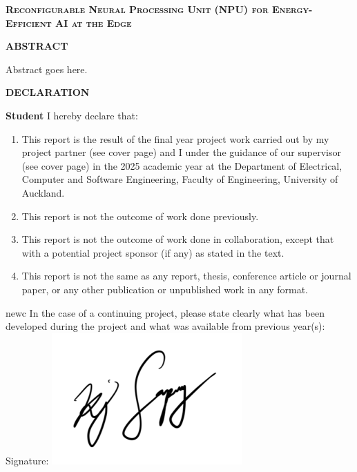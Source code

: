 \documentclass[12pt, a4paper, ukenglish]{article}
\begin{document}
\clearpage

\noindent \reportNumber

\vspace{1em}
\begin{center}
    {\large \textbf{\scshape Reconfigurable Neural Processing Unit (NPU) for Energy-Efficient AI at the Edge}}
\end{center}

\vspace{2em}
\begin{center}
    {\large \textbf{\name}}
\end{center}

\vspace{2em}
\begin{center}
    {\large \textbf{\scshape ABSTRACT}}
\end{center}

Abstract goes here.

% 
\clearpage
\newpage
\vspace{2em}
\begin{center}
\Large\textbf{DECLARATION}
\end{center}
\noindent
\textbf{Student}
\vspace{1em}
I hereby declare that:
\begin{enumerate}
    \item This report is the result of the final year project work carried out by my project partner (see cover page) and I under the guidance of our supervisor (see cover page) in the 2025 academic year at the Department of Electrical, Computer and Software Engineering, Faculty of Engineering, University of Auckland. 
    \item This report is not the outcome of work done previously. 
    \item This report is not the outcome of work done in collaboration, except that with a potential project sponsor (if any) as stated in the text.
    \item This report is not the same as any report, thesis, conference article or journal paper, or any other publication or unpublished work in any format. 
\end{enumerate}
\vspace{1em}newc
\noindent
In the case of a continuing project, please state clearly what has been developed during the project and what was available from previous year(s): 
\vspace{3cm}
\noindent
\newline
Signature:
\includegraphics[width=0.3\linewidth]{figures/signature.png}
\end{document}
